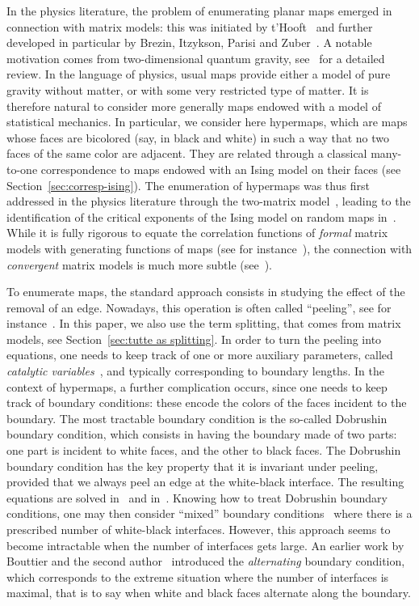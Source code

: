 \documentclass{scrartcl}
\begin{document}
In the physics literature, the problem of enumerating planar maps emerged in connection with matrix models: this was initiated by t’Hooft~\cite{thooft} and further developed in particular by Brezin, Itzykson, Parisi and Zuber~\cite{bipz}. A notable motivation comes from two-dimensional quantum gravity, see~\cite{dfgzj} for a detailed review. In the language of physics, usual maps provide either a model of pure gravity without  matter, or with some very restricted type of matter. It is therefore natural to consider more generally maps endowed with a model of statistical mechanics. In particular, we consider here hypermaps, which are maps whose faces are bicolored (say, in black and white) in such a way that no two faces of the same color are adjacent. They are related through a classical many-to-one correspondence to maps endowed with an Ising model on their faces (see Section~\ref{sec:corresp-ising}). The enumeration of hypermaps was thus first addressed in the physics literature through the two-matrix model~\cite{iz,mehta,douglas,staudacher,dkk}, leading to the identification of the critical exponents of the Ising model on random maps in~\cite{kazakov,boulatov-kazakov}. While it is fully rigorous to equate the correlation functions of \emph{formal} matrix models with generating functions of maps (see for instance~\cite{eynard-formal-matrix}), the connection with \emph{convergent} matrix models is much more subtle (see~\cite{guionnet-maurel-segala}).


To enumerate maps, the standard approach consists in studying the effect of the removal of an edge. Nowadays, this operation is often called ``peeling'', see for instance~\cite{curien-stflour}. In this paper, we also use the term splitting, that comes from matrix models, see Section~\ref{sec:tutte as splitting}. In order to turn the peeling into equations, one needs to keep track of one or more auxiliary parameters, called \emph{catalytic variables}~\cite{BoJe06}, and typically corresponding to boundary lengths. In the context of hypermaps, a further complication occurs, since one needs to keep track of boundary conditions: these encode the colors of the faces incident to the boundary. The most tractable boundary condition is the so-called Dobrushin boundary condition, which consists in having the boundary made of two parts: one part is incident to white faces, and the other to black faces. The Dobrushin boundary condition has the key property that it is invariant under peeling, provided that we always peel an edge at the white-black interface. The resulting equations are solved in~\cite{Eyn_2003,eynard} and in~\cite{chen-turunen}. Knowing how to treat Dobrushin boundary conditions, one may then consider ``mixed'' boundary conditions~\cite{eyn_2005} where there is a prescribed number of white-black interfaces. However, this approach seems to become intractable when the number of interfaces gets large. An earlier work by Bouttier and the second author~\cite{bouttier-carrance} introduced the \emph{alternating} boundary condition, which corresponds to the extreme situation where the number of interfaces is maximal, that is to say when white and black faces alternate along the boundary. 
\end{document}
